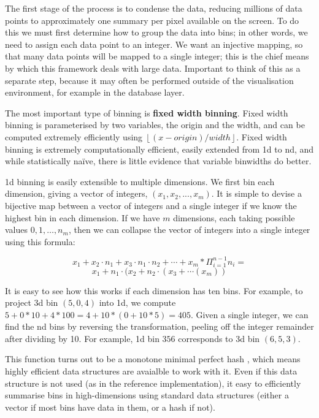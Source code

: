 \documentclass[journal]{vgtc}                %
\begin{document}
The first stage of the process is to condense the data, reducing millions of data points to approximately one summary per pixel available on the screen.  To do this we must first determine how to group the data into bins; in other words, we need to assign each data point to an integer. We want an injective mapping, so that many data points will be mapped to a single integer; this is the chief means by which this framework deals with large data. Important to think of this as a separate step, because it may often be performed outside of the visualisation environment, for example in the database layer. 

The most important type of binning is {\bf fixed width binning}. Fixed width binning is parameterised by two variables, the origin and the width, and can be computed extremely efficiently using $\left \lfloor (x - origin) / width \right \rfloor $. Fixed width binning is extremely computationally efficient, easily extended from 1d to nd, and while statistically na\"ive, there is little evidence that variable binwidths do better.

1d binning is easily extensible to multiple dimensions. We first bin each dimension, giving a vector of integers, $(x_1, x_2, ..., x_m)$. It is simple to devise a bijective map between a vector of integers and a single integer if we know the highest bin in each dimension. If we have $m$ dimensions, each taking possible values $0, 1, \ldots, n_m$, then we can collapse the vector of integers into a single integer using this formula:

\[ x_1 + x_2 \cdot n_1 + x_3 \cdot n_1 \cdot n_2 + \cdots + x_m * \Pi^{n-1}_{i = 1} n_i = \]
\[ x_1 + n_1 \cdot (x_2 + n_2 \cdot (x_3 + \cdots(x_m)) \]

It is easy to see how this works if each dimension has ten bins. For example, to project 3d bin $(5, 0, 4)$ into 1d, we compute $5 + 0 * 10 + 4 * 100 = 4 + 10 * (0 + 10 * 5) = 405$. Given a single integer, we can find the nd bins by reversing the transformation, peeling off the integer remainder after dividing by 10. For example, 1d bin $356$ corresponds to 3d bin $(6, 5, 3)$.

This function turns out to be a monotone minimal perfect hash \citep{belazzougui:2009}, which means highly efficient data structures are avaialble to work with it. Even if this data structure is not used (as in the reference implementation), it easy to efficiently summarise bins in high-dimensions using standard data structures (either a vector if most bins have data in them, or a hash if not).
\end{document}
